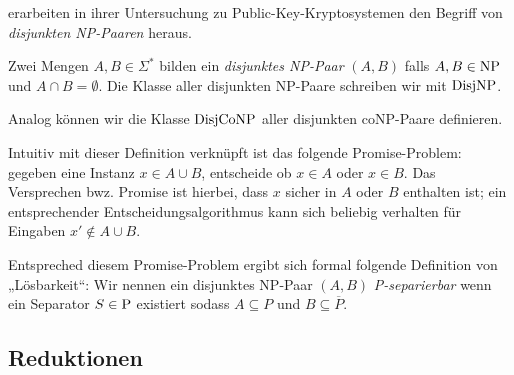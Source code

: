 \textcite{grollmann_complexity_1988} erarbeiten in ihrer Untersuchung zu Public-Key-Kryptosystemen den Begriff von \emph{disjunkten NP-Paaren} heraus.

\begin{definition}[$\DisjNP, \DisjCoNP$]
    Zwei Mengen $A,B\in\Sigma^*$ bilden ein \emph{disjunktes NP-Paar} $(A,B)$ falls $A,B\in\NP$ und $A\cap B = \emptyset$.
    Die Klasse aller disjunkten NP-Paare schreiben wir mit $\DisjNP$.
    
    Analog können wir die Klasse $\DisjCoNP$ aller disjunkten coNP-Paare definieren.
\end{definition}
Intuitiv mit dieser Definition verknüpft ist das folgende Promise-Problem: gegeben eine Instanz $x\in A\cup B$, entscheide ob $x\in A$ oder $x\in B$. Das Versprechen bwz. Promise ist hierbei, dass $x$ sicher in $A$ oder $B$ enthalten ist; ein entsprechender Entscheidungsalgorithmus kann sich beliebig verhalten für Eingaben $x'\not\in A\cup B$.

Entspreched diesem Promise-Problem ergibt sich formal folgende Definition von „Lösbarkeit“:
Wir nennen ein disjunktes NP-Paar $(A,B)$ \emph{P-separierbar} wenn ein Separator $S\in\P$ existiert sodass $A\subseteq P$ und $B\subseteq\overline{P}$.

\subsection*{Reduktionen}

